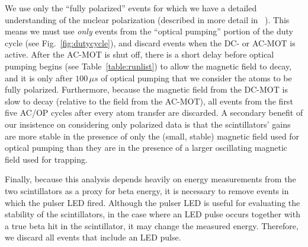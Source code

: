 We use only the ``fully polarized'' events for which we have a detailed understanding of the nuclear polarization (described in more detail in ~\cite{ben_OP}).  This means we must use \emph{only} events from the ``optical pumping'' portion of the duty cycle (see Fig.~\ref{fig:dutycycle}), and discard events when the DC- or AC-MOT is active.  After the AC-MOT is shut off, there is a short delay before optical pumping begins (see Table~\ref{table:runlist}) to allow the magnetic field to decay, and it is only after $100\,\mu s$ of optical pumping that we consider the atoms to be fully polarized.  Furthermore, because the magnetic field from the DC-MOT is slow to decay (relative to the field from the AC-MOT), all events from the first five AC/OP cycles after every atom transfer are discarded.  A secondary benefit of our insistence on considering only polarized data is that the scintillators' gains are more stable in the presence of only the (small, stable) magnetic field used for optical pumping than they are in the presence of a larger oscillating magnetic field used for trapping.

Finally, because this analysis depends heavily on energy measurements from the two scintillators as a proxy for beta energy, it is necessary to remove events in which the pulser LED fired.  Although the pulser LED is useful for evaluating the stability of the scintillators, in the case where an LED pulse occurs together with a true beta hit in the scintillator, it may change the measured energy.  Therefore, we discard all events that include an LED pulse.   
	





